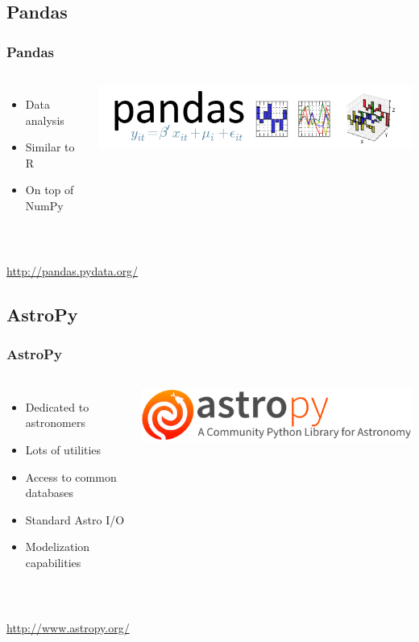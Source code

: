 \documentclass[14pt]{beamer}
\begin{document}
\subsection{Pandas}
\begin{frame}
\frametitle{Pandas}
\begin{columns}
\begin{itemize}
\item Data analysis
\item Similar to R
\item On top of NumPy
\end{itemize}
\includegraphics[width=\textwidth]{pandas_logo.png}
\end{columns}
~\\
\url{http://pandas.pydata.org/}
\end{frame}

\subsection{AstroPy}
\begin{frame}
\frametitle{AstroPy}
\begin{columns}
\begin{itemize}
\item Dedicated to astronomers
\item Lots of utilities
\item Access to common databases
\item Standard Astro I/O
\item Modelization capabilities
\end{itemize}
\includegraphics[width=\textwidth]{astropy_banner_96.png}
\end{columns}
~\\
\url{http://www.astropy.org/}
\end{frame}
\end{document}
